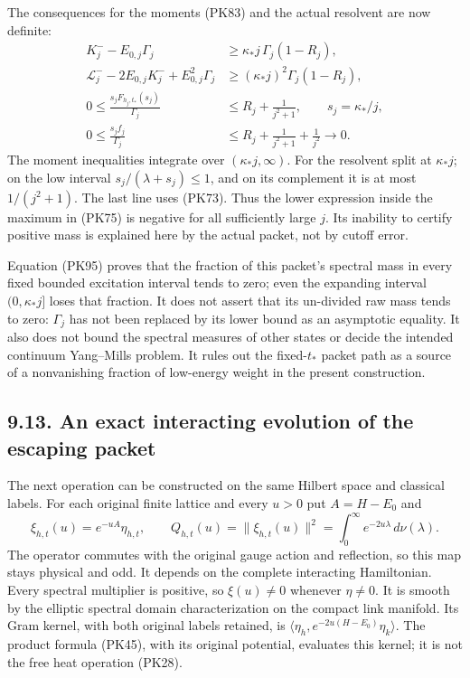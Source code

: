 \documentclass[11pt]{article}
\begin{document}
The consequences for the moments (PK83) and the actual resolvent are
now definite:
\[
 \begin{split}
 K_j^--E_{0,j}\Gamma_j
   &\ge\kappa_*j\,\Gamma_j(1-R_j),\\
 \mathcal L_j^--2E_{0,j}K_j^-+E_{0,j}^2\Gamma_j
   &\ge(\kappa_*j)^2\Gamma_j(1-R_j),\\
 0\le\frac{s_jF_{h_j,t_*}(s_j)}{\Gamma_j}
   &\le R_j+\frac1{j^2+1},\qquad s_j=\kappa_*/j,\\
 0\le\frac{s_jf_j}{\Gamma_j}
   &\le R_j+\frac1{j^2+1}+\frac1{j^2}
       \longrightarrow0 .
 \end{split}\tag{PK97}
\]
The moment inequalities integrate over
\((\kappa_*j,\infty)\). For the resolvent split at \(\kappa_*j\);
on the low interval \(s_j/(\lambda+s_j)\le1\), and on its complement
it is at most \(1/(j^2+1)\). The last line uses (PK73).
Thus the lower expression inside the maximum in (PK75) is negative
for all sufficiently large \(j\). Its inability to certify positive
mass is explained here by the actual packet, not by cutoff error.

Equation (PK95) proves that the fraction of this packet's spectral
mass in every fixed bounded excitation interval tends to zero; even
the expanding interval \((0,\kappa_*j]\) loses that fraction.
It does not assert that its un-divided raw mass tends to zero:
\(\Gamma_j\) has not been replaced by its lower bound as an
asymptotic equality. It also does not bound the spectral measures of
other states or decide the intended continuum Yang–Mills problem.
It rules out the fixed-\(t_*\) packet path as a source of a nonvanishing
fraction of low-energy weight in the present construction.

\subsection*{9.13. An exact interacting evolution of the escaping packet}

The next operation can be constructed on the same Hilbert space and
classical labels. For each original finite lattice and every \(u>0\)
put \(A=H-E_0\) and
\[
 \xi_{h,t}(u)=e^{-uA}\eta_{h,t},\qquad
 Q_{h,t}(u)=\|\xi_{h,t}(u)\|^2
          =\int_0^\infty e^{-2u\lambda}\,d\nu(\lambda).
 \tag{PK98}
\]
The operator commutes with the original gauge action and reflection,
so this map stays physical and odd. It depends on the complete
interacting Hamiltonian. Every spectral multiplier is positive, so
\(\xi(u)\ne0\) whenever \(\eta\ne0\). It is smooth by the elliptic
spectral domain characterization on the compact link manifold.
Its Gram kernel, with both original labels retained, is
\(\langle\eta_h,e^{-2u(H-E_0)}\eta_k\rangle\).
The product formula (PK45), with its original potential, evaluates
this kernel; it is not the free heat operation (PK28).
\end{document}
